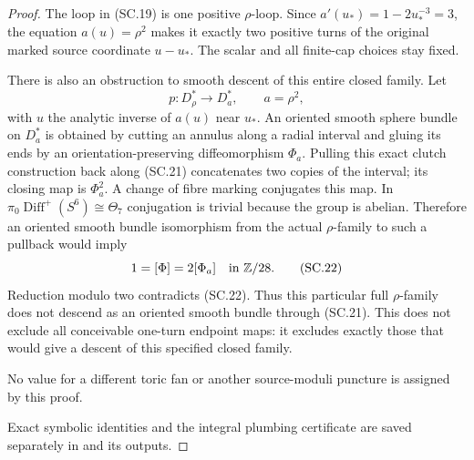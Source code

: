 \begin{proof}
The loop in (SC.19) is one positive \(\rho\)-loop. Since
\(a'(u_*)=1-2u_*^{-3}=3\), the equation \(a(u)=\rho^2\) makes it
exactly two positive turns of the original marked source coordinate
\(u-u_*\). The scalar and all finite-cap choices stay fixed.

There is also an obstruction to smooth descent of this entire closed
family. Let
\[
 p:D_\rho^*\longrightarrow D_a^*,\qquad a=\rho^2,
                                                               \tag{SC.21}
\]
with \(u\) the analytic inverse of \(a(u)\) near \(u_*\). An oriented
smooth sphere bundle on \(D_a^*\) is obtained by cutting an annulus
along a radial interval and gluing its ends by an orientation-preserving
diffeomorphism \(\Phi_a\). Pulling this exact clutch construction back
along (SC.21) concatenates two copies of the interval; its closing map
is \(\Phi_a^2\). A change of fibre marking conjugates this map.
In \(\pi_0\operatorname{Diff}^+(S^6)\cong\Theta_7\) conjugation is
trivial because the group is abelian. Therefore an oriented smooth
bundle isomorphism from the actual \(\rho\)-family to such a pullback
would imply
\[
                1=[\Phi]=2[\Phi_a]\quad\hbox{in }\mathbb Z/28.
                                                               \tag{SC.22}
\]
Reduction modulo two contradicts (SC.22). Thus this particular full
\(\rho\)-family does not descend as an oriented smooth bundle through
(SC.21). This does not exclude all conceivable one-turn endpoint maps:
it excludes exactly those that would give a descent of this specified
closed family.

No value for a different toric fan or another source-moduli puncture
is assigned by this proof.

Exact symbolic identities and the integral plumbing certificate are
saved separately in  and its outputs.

\end{proof}
